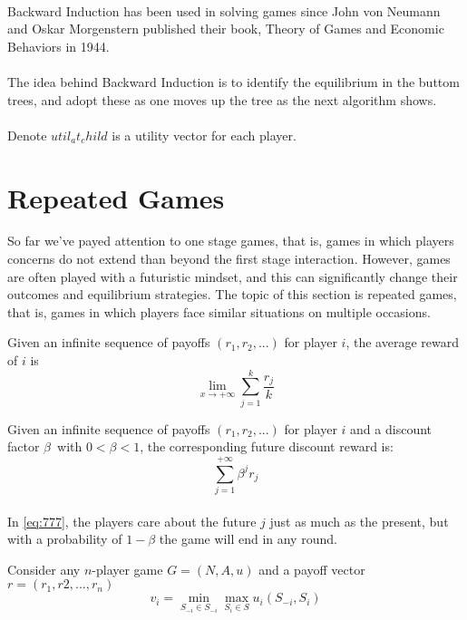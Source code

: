 \paragraph{}Backward Induction has been used in solving games since John von Neumann and Oskar Morgenstern published their book, Theory of Games and Economic Behaviors in 1944.
\paragraph{}The idea behind Backward Induction is to identify the equilibrium in the buttom trees, and adopt these as one moves up the tree as the next algorithm shows.


\paragraph{} Denote $util_at_child$ is a utility vector for each player.
\section{Repeated Games}
So far we've payed attention to one stage games, that  is, games in which players concerns do not extend than beyond the first stage interaction. However, games are often played with a futuristic mindset, and this can significantly change their outcomes and equilibrium strategies. The topic of this section is repeated games, that is, games in which players face similar situations on multiple occasions.
\begin{mydef}\label{def:def666}
Given an infinite sequence of payoffs $(r_1, r_2, ...) $ for player $i$, the average reward of $i$ is
 \begin{equation}
  \lim_{x \to +\infty} \sum_{j=1}^k \frac{r_j}{k}
 \end{equation}	
\end{mydef}
\begin{mydef}\label{def:def777}
Given an infinite sequence of payoffs  $(r_1, r_2, ...) $ for player $i$ and a discount factor $\beta$\ with $ 0 < \beta < 1 $, the corresponding future discount reward is: 
 \begin{equation}\label{eq:777}
 \sum_{j=1}^{+\infty} \beta^j r_j
\end{equation}
\end{mydef}
\paragraph{}In \ref{eq:777}, the players care about the future $j$ just as much as the present, but with a probability of $1 - \beta$ the game will end in any round.
\begin{mydef}\label{def:def888}
Consider any $n$-player game $G = (N,A,u)$ and a payoff vector $r = (r_1, r2, ..., r_n)$
 \begin{equation}\label{eq:999}
	v_i = \min_{S_{-i} \in S_{-i}} \max_{S_i \in S} u_i (S_{-i}, S_i)
\end{equation}
\end{mydef}
